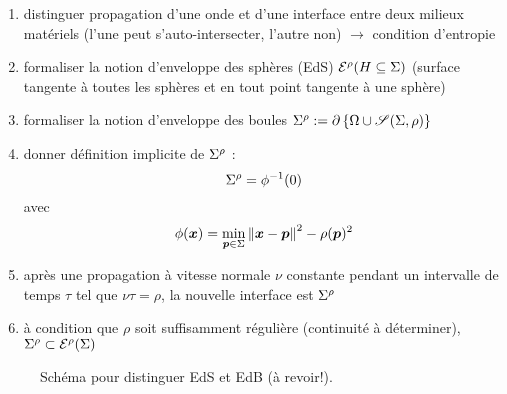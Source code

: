 \par\bigskip
\begin{enumerate}
	\item distinguer propagation d'une onde et d'une interface entre deux milieux matériels (l'une peut s'auto-intersecter, l'autre non) $\to$ condition d'entropie
	\item formaliser la notion d'enveloppe des sphères (EdS) ${\mathcal{E}}^{\rho}({H \subseteq \Sigma})$ (surface tangente à toutes les sphères et en tout point tangente à une sphère)
	\item formaliser la notion d'enveloppe des boules $\EdB{\Sigma}{\rho} := \boundary{\left\{\Omega \cup \sphere[\Sigma][\rho]\right\}}$
	\item donner définition implicite de ${\Sigma}^{\rho}$ :
	\[ {\Sigma}^{\rho} = \phi^{-1}(0) \]
	avec 
	\[ \phi(\bm{x}) = \min_{\bm{p} \in \Sigma} \left\| {\bm{x} - \bm{p}} \right\|^2 - \rho(\bm{p})^2 \]
	\item après une propagation à vitesse normale $\nu$ constante pendant un intervalle de temps $\tau$ tel que $\nu \tau = \rho$, la nouvelle interface est ${\Sigma}^{\rho}$
	\item à condition que $\rho$ soit suffisamment régulière (continuité à déterminer), ${\Sigma}^{\rho} \subset {\mathcal{E}}^{\rho}({\Sigma})$
\end{enumerate}


\begin{figure}
	\centering
	\caption{Schéma pour distinguer EdS et EdB (à revoir!).}
	\label{fig:EdS_EdB}
\end{figure}

